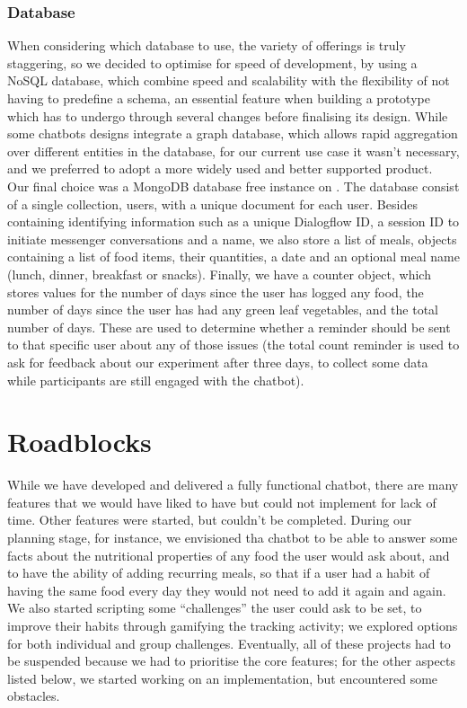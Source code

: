 \subsubsection{Database}
When considering which database to use, the variety of offerings is truly staggering, so we decided to optimise for speed of development, by using a NoSQL database, which combine speed and scalability with the flexibility of not having to predefine a schema, an essential feature when building a prototype which has to undergo through several changes before finalising its design. While some chatbots designs integrate a graph database, which allows rapid aggregation over different entities in the database, for our current use case it wasn't necessary, and we preferred to adopt a more widely used and better supported product.\\
Our final choice was a MongoDB database free instance on \cite{mlab.com}. The database consist of a single collection, users, with a unique document for each user. Besides containing identifying information such as a unique Dialogflow ID, a session ID to initiate messenger conversations and a name, we also store a list of meals, objects containing a list of food items, their quantities, a date and an optional meal name (lunch, dinner, breakfast or snacks). Finally, we have a counter object, which stores values for the number of days since the user has logged any food, the number of days since the user has had any green leaf vegetables, and the total number of days. These are used to determine whether a reminder should be sent to that specific user about any of those issues (the total count reminder is used to ask for feedback about our experiment after three days, to collect some data while participants are still engaged with the chatbot).
\section{Roadblocks}
While we have developed and delivered a fully functional chatbot, there are many features that we would have liked to have but could not implement for lack of time. Other features were started, but couldn't be completed. During our planning stage, for instance, we envisioned tha chatbot to be able to answer some facts about the nutritional properties of any food the user would ask about, and to have the ability of adding recurring meals, so that if a user had a habit of having the same food every day they would not need to add it again and again. We also started scripting some ``challenges'' the user could ask to be set, to improve their habits through gamifying the tracking activity; we explored options for both individual and group challenges. Eventually, all of these projects had to be suspended because we had to prioritise the core features; for the other aspects listed below, we started working on an implementation, but encountered some obstacles. 
